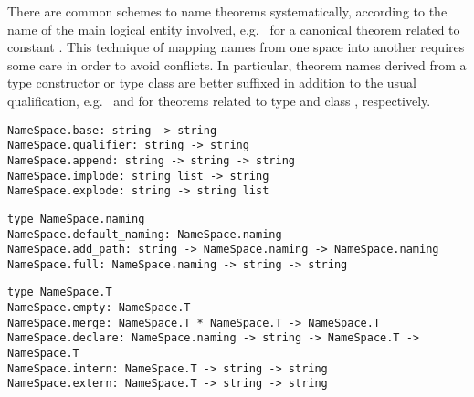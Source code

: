 \begin{isabellebody}
\begin{isamarkuptext}
  There are common schemes to name theorems systematically, according
  to the name of the main logical entity involved, e.g.\  for a canonical theorem related to constant .
  This technique of mapping names from one space into another requires
  some care in order to avoid conflicts.  In particular, theorem names
  derived from a type constructor or type class are better suffixed in
  addition to the usual qualification, e.g.\ 
  and  for theorems related to type 
  and class , respectively.%
\end{isamarkuptext}%
\isamarkuptrue%
%
\isadelimmlref
%
\endisadelimmlref
%
\isatagmlref
%
\begin{isamarkuptext}%
\begin{mldecls}
  \verb|NameSpace.base: string -> string| \\
  \verb|NameSpace.qualifier: string -> string| \\
  \verb|NameSpace.append: string -> string -> string| \\
  \verb|NameSpace.implode: string list -> string| \\
  \verb|NameSpace.explode: string -> string list| \\
  \end{mldecls}
  \begin{mldecls}
  \verb|type NameSpace.naming| \\
  \verb|NameSpace.default_naming: NameSpace.naming| \\
  \verb|NameSpace.add_path: string -> NameSpace.naming -> NameSpace.naming| \\
  \verb|NameSpace.full: NameSpace.naming -> string -> string| \\
  \end{mldecls}
  \begin{mldecls}
  \verb|type NameSpace.T| \\
  \verb|NameSpace.empty: NameSpace.T| \\
  \verb|NameSpace.merge: NameSpace.T * NameSpace.T -> NameSpace.T| \\
  \verb|NameSpace.declare: NameSpace.naming -> string -> NameSpace.T -> NameSpace.T| \\
  \verb|NameSpace.intern: NameSpace.T -> string -> string| \\
  \verb|NameSpace.extern: NameSpace.T -> string -> string| \\
  \end{mldecls}


\end{isamarkuptext}
\end{isabellebody}
